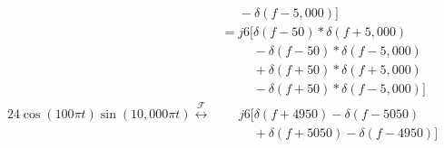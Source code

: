 \documentclass[a4paper, 12pt]{article}
\begin{document}
\begin{itemize}
\begin{itemize}
\begin{itemize}
\begin{equation}
\begin{gathered}
\begin{alignedat}{1}
&\;\;\;\;\;- \delta \left(f - 5,000 \right)] \\
& = j6 [ \delta \left(f - 50\right) * \delta \left(f + 5,000 \right) \\
& \;\;\;\;\;\;\;\;\; - \delta \left(f - 50\right) * \delta \left(f - 5,000 \right) \\
& \;\;\;\;\;\;\;\;\; + \delta \left(f + 50\right) * \delta \left(f + 5,000 \right) \\
& \;\;\;\;\;\;\;\;\; - \delta \left(f + 50\right) * \delta \left(f - 5,000 \right)] \\
24 \cos \left(100 \pi t \right) \sin \left(10,000 \pi t \right) \overset{\mathcal{F}}{\leftrightarrow} & \;\;\;\;\; j6 [ \delta(f + 4950) - \delta (f - 5050) \\
& \;\;\;\;\;\;\;\;\;+ \delta ( f + 5050) - \delta(f - 4950)]
\end{alignedat}
\end{gathered}
\end{equation}
\end{itemize}


\end{itemize}
\end{itemize}
\end{document}
